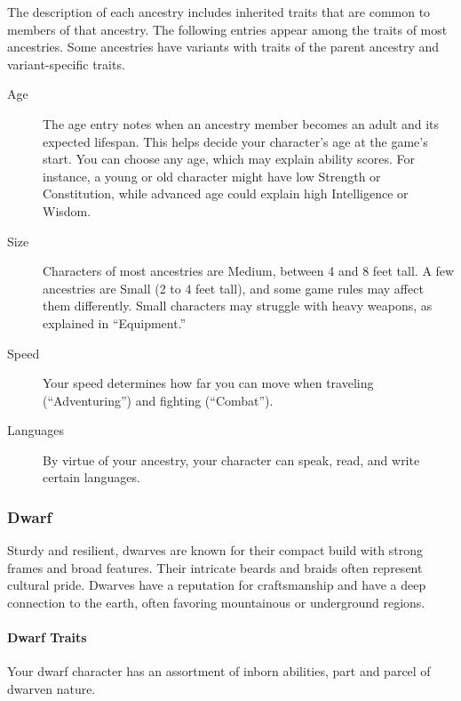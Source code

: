 The description of each ancestry includes inherited traits that are
common to members of that ancestry. The following entries appear among
the traits of most ancestries. Some ancestries have variants with traits
of the parent ancestry and variant-specific traits.

\begin{description}
\item[Age]
The age entry notes when an ancestry member becomes an adult and its
expected lifespan. This helps decide your character's age at the game's
start. You can choose any age, which may explain ability scores. For
instance, a young or old character might have low Strength or
Constitution, while advanced age could explain high Intelligence or
Wisdom.
\item[Size]
Characters of most ancestries are Medium, between 4 and 8 feet tall. A
few ancestries are Small (2 to 4 feet tall), and some game rules may
affect them differently. Small characters may struggle with heavy
weapons, as explained in ``Equipment.''
\item[Speed]
Your speed determines how far you can move when traveling
(``Adventuring'') and fighting (``Combat'').
\item[Languages]
By virtue of your ancestry, your character can speak, read, and write
certain languages.
\end{description}

\subsubsection{Dwarf}\label{ancestry-dwarf}

Sturdy and resilient, dwarves are known for their compact build with
strong frames and broad features. Their intricate beards and braids
often represent cultural pride. Dwarves have a reputation for
craftsmanship and have a deep connection to the earth, often favoring
mountainous or underground regions.

\paragraph{Dwarf Traits}\label{_dwarf_traits}

Your dwarf character has an assortment of inborn abilities, part and
parcel of dwarven nature.

